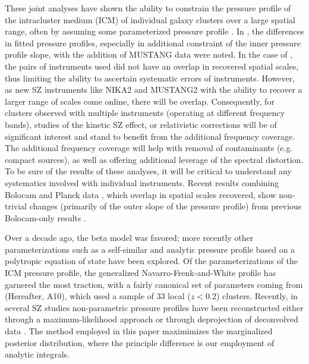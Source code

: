 \documentclass[twocolumn,traditabstract]{aa}
\begin{document}
These joint analyses have shown the ability to constrain the pressure profile of the intracluster medium (ICM) of individual
galaxy clusters over a large spatial range, often by assuming some parameterized pressure profile \citep[e.g.][]{romero2017,adam2014}.
In \citet{romero2015a}, the differences in fitted pressure profiles, especially in additional constraint of the inner pressure profile
slope, with the addition of MUSTANG data were noted. In the case of
\citet{romero2017,adam2015,adam2016a}, the pairs of instruments used did not have an overlap in recovered spatial scales, thus
limiting the ability to ascertain systematic errors of instruments.
However, as new SZ instruments like NIKA2 \citep[][]{monfardini2014,calvo2016} and MUSTANG2 \citep[][]{dicker2014a}
with the ability to recover a larger range of scales come online, there will be overlap. Consequently, for clusters observed
with multiple instruments (operating at different frequency bands), studies of the kinetic SZ effect, or relativistic
corrections \citep{itoh1998} will be of significant interest and stand to benefit from the additional frequency coverage.
The additional frequency coverage will help with removal of contaminants (e.g. compact sources), as well as offering additional
leverage of the spectral distortion. 
To be sure of the results of these analyses, it will be critical to
understand any systematics involved with individual instruments. Recent results combining Bolocam and Planck data \citep{sayers2016},
which overlap in spatial scales recovered, show non-trivial changes (primarily of the outer slope of the pressure profile)
from previous Bolocam-only results \citep{sayers2013}.

Over a decade ago, the beta model
\citep{cavaliere1978} was favored; more recently other parameterizations such as a self-similar \citep{mroczkowski2009} and
analytic pressure profile based on a polytropic equation of state \citep{bulbul2010} have been explored. Of the parameterizations
of the ICM pressure profile, the generalized Navarro-Frenk-and-White \citep[gNFW][]{nagai2007} profile has garnered the most traction,
with a fairly canonical set of parameters coming from \citet{arnaud2010} (Hereafter, A10), which used a sample of 33 local ($z < 0.2$)
clusters.
Recently, in several SZ studies non-parametric pressure profiles have been reconstructed either through a maximum-likelihood approach
\citep[e.g.][]{ruppin2017,sayers2013} or through deprojection of deconvolved data  \citep[e.g.][]{basu2010,sayers2011}.
The method employed in this
paper maximimizes the marginalized posterior distribution, where the principle difference is our employment of analytic integrals.
\end{document}
